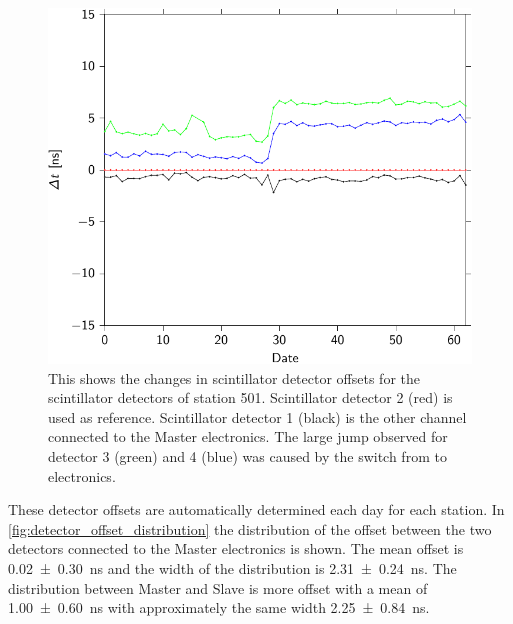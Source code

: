 \begin{figure}
    \centering
    \includegraphics{plots/station/detector_offset_drift_month_501}
    \caption{This shows the changes in scintillator detector offsets for the scintillator detectors of station 501. Scintillator detector 2 (red) is used as reference. Scintillator detector 1 (black) is the other channel connected to the Master electronics. The large jump observed for detector 3 (green) and 4 (blue) was caused by the switch from \hisparcii to \hisparciii electronics.}
    \label{fig:detector_offset_drift_month_501}
\end{figure}

These detector offsets are automatically determined each day for each station. In \cref{fig:detector_offset_distribution} the distribution of the offset between the two detectors connected to the Master electronics is shown. The mean offset is \SI{0.02 \pm 0.30}{\ns} and the width of the distribution is \SI{2.31 \pm 0.24}{\ns}. The distribution between Master and Slave is more offset with a mean of \SI{1.00 \pm 0.60}{\ns} with approximately the same width \SI{2.25 \pm 0.84}{\ns}.


